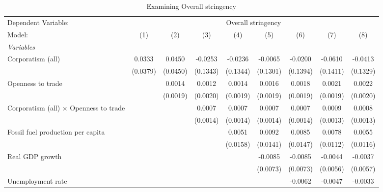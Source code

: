
\begin{table}[htbp]
   \caption{Examining Overall stringency}
   \centering
   \begin{tabular}{lcccccccc}
      \tabularnewline \midrule \midrule
      Dependent Variable: & \multicolumn{8}{c}{Overall stringency}\\
      Model:                                        & (1)      & (2)      & (3)      & (4)      & (5)      & (6)      & (7)      & (8)\\  
      \midrule
      \emph{Variables}\\
      Corporatism (all)                             & 0.0333   & 0.0450   & -0.0253  & -0.0236  & -0.0065  & -0.0200  & -0.0610  & -0.0413\\   
                                                    & (0.0379) & (0.0450) & (0.1343) & (0.1344) & (0.1301) & (0.1394) & (0.1411) & (0.1329)\\   
      Openness to trade                             &          & 0.0014   & 0.0012   & 0.0014   & 0.0016   & 0.0018   & 0.0021   & 0.0022\\   
                                                    &          & (0.0019) & (0.0020) & (0.0019) & (0.0019) & (0.0019) & (0.0019) & (0.0020)\\   
      Corporatism (all) $\times$ Openness to trade  &          &          & 0.0007   & 0.0007   & 0.0007   & 0.0007   & 0.0009   & 0.0008\\   
                                                    &          &          & (0.0014) & (0.0014) & (0.0014) & (0.0014) & (0.0013) & (0.0013)\\   
      Fossil fuel production per capita             &          &          &          & 0.0051   & 0.0092   & 0.0085   & 0.0078   & 0.0055\\   
                                                    &          &          &          & (0.0158) & (0.0141) & (0.0147) & (0.0112) & (0.0116)\\   
      Real GDP growth                               &          &          &          &          & -0.0085  & -0.0085  & -0.0044  & -0.0037\\   
                                                    &          &          &          &          & (0.0073) & (0.0073) & (0.0056) & (0.0057)\\   
      Unemployment rate                             &          &          &          &          &          & -0.0062  & -0.0047  & -0.0033\\   

\end{tabular}
\end{table}
